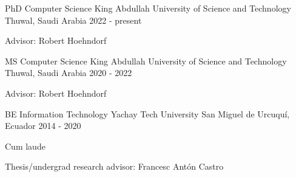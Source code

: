 

\begin{cventries}

  \cventry
  {PhD Computer Science} %
  {King Abdullah University of Science and Technology} %
  {Thuwal, Saudi Arabia} %
  {2022 - present} %
    {
      \begin{cvitems} %
      \item {Advisor: Robert Hoehndorf}
      \end{cvitems}
    }

  \cventry
  {MS Computer Science} %
  {King Abdullah University of Science and Technology} %
  {Thuwal, Saudi Arabia} %
  {2020 - 2022} %
    {
      \begin{cvitems} %
      \item {Advisor: Robert Hoehndorf}
      \end{cvitems}
    }

  \cventry
  {BE Information Technology} %
  {Yachay Tech University} %
  {San Miguel de Urcuquí, Ecuador} %
    {2014 - 2020} %
    {
      \begin{cvitems} %
      \item {Cum laude}
      \item {Thesis/undergrad research advisor: Francesc Antón Castro}
      \end{cvitems}
    }

\end{cventries}
